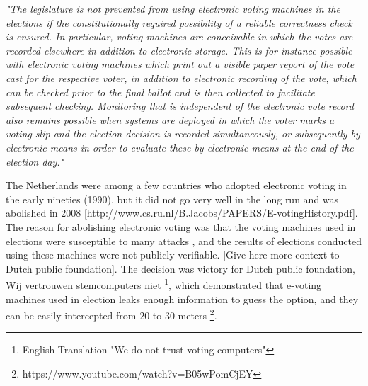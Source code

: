   \textit{"The legislature is not prevented from using electronic voting machines 
  in the elections if the constitutionally required possibility of a 
  reliable correctness check is ensured. In particular, voting machines 
  are conceivable in which the votes are recorded elsewhere in addition
   to electronic storage. This is for instance possible with electronic
   voting machines which print out a visible paper report of the vote 
   cast for the respective voter, in addition to electronic recording 
   of the vote, which can be checked prior to the final ballot and is
    then collected to facilitate subsequent checking. Monitoring that is
     independent of the electronic vote record also remains possible when
     systems are deployed in which the voter marks a voting slip and the 
     election decision is recorded simultaneously, 
     or subsequently by electronic means in 
     order to evaluate these by electronic means at the end of the 
     election day."}
  
  The Netherlands were among a few countries who adopted electronic voting 
  in the early nineties (1990), but it did not go very well in the long 
  run and was abolished in 2008 
  [http://www.cs.ru.nl/B.Jacobs/PAPERS/E-votingHistory.pdf]. 
  The reason for abolishing electronic voting was that   
  the voting machines used in elections were susceptible to many attacks
  , and the results of elections conducted using these machines 
  were not publicly verifiable. [Give here more context to 
  Dutch public foundation]. The decision was victory for 
  Dutch public foundation, Wij vertrouwen stemcomputers niet
  \footnote{English Translation "We do not trust voting computers"}, which 
  demonstrated that e-voting machines used in election leaks enough
  information to guess the option, 
  and they can be easily intercepted from 20 to 30 meters
  \footnote{https://www.youtube.com/watch?v=B05wPomCjEY}. 
  
